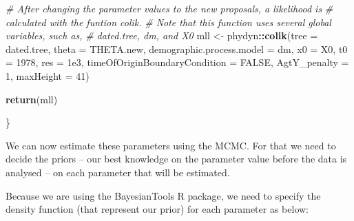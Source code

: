 \documentclass[12pt,]{article}
\newenvironment{Shaded}{\begin{snugshade}}{\end{snugshade}}
\newcommand{\CommentTok}[1]{\textcolor[rgb]{0.56,0.35,0.01}{\textit{#1}}}
\newcommand{\DataTypeTok}[1]{\textcolor[rgb]{0.13,0.29,0.53}{#1}}
\newcommand{\DecValTok}[1]{\textcolor[rgb]{0.00,0.00,0.81}{#1}}
\newcommand{\FloatTok}[1]{\textcolor[rgb]{0.00,0.00,0.81}{#1}}
\newcommand{\KeywordTok}[1]{\textcolor[rgb]{0.13,0.29,0.53}{\textbf{#1}}}
\newcommand{\NormalTok}[1]{#1}
\newcommand{\OperatorTok}[1]{\textcolor[rgb]{0.81,0.36,0.00}{\textbf{#1}}}
\newcommand{\OtherTok}[1]{\textcolor[rgb]{0.56,0.35,0.01}{#1}}
\newcommand{\StringTok}[1]{\textcolor[rgb]{0.31,0.60,0.02}{#1}}
\begin{document}
\begin{Shaded}
\begin{Highlighting}[]
  \CommentTok{# After changing the parameter values to the new proposals, a likelihood is}
  \CommentTok{# calculated with the funtion colik.}
  \CommentTok{# Note that this function uses several global variables, such as, }
  \CommentTok{# dated.tree, dm, and X0}
\NormalTok{  mll <-}\StringTok{ }\NormalTok{phydyn}\OperatorTok{::}\KeywordTok{colik}\NormalTok{(}\DataTypeTok{tree =}\NormalTok{ dated.tree,}
               \DataTypeTok{theta =}\NormalTok{ THETA.new,}
               \DataTypeTok{demographic.process.model =}\NormalTok{ dm,}
               \DataTypeTok{x0 =}\NormalTok{ X0,}
               \DataTypeTok{t0 =} \DecValTok{1978}\NormalTok{,}
               \DataTypeTok{res =} \FloatTok{1e3}\NormalTok{,}
               \DataTypeTok{timeOfOriginBoundaryCondition =} \OtherTok{FALSE}\NormalTok{,}
               \DataTypeTok{AgtY_penalty =} \DecValTok{1}\NormalTok{,}
               \DataTypeTok{maxHeight =} \DecValTok{41}\NormalTok{)}

  \KeywordTok{return}\NormalTok{(mll)}

\NormalTok{\}}
\end{Highlighting}
\end{Shaded}

We can now estimate these parameters using the MCMC. For that we need to
decide the priors -- our best knowledge on the parameter value before
the data is analysed -- on each parameter that will be estimated.

Because we are using the BayesianTools R package, we need to specify the
density function (that represent our prior) for each parameter as below:
\end{document}
